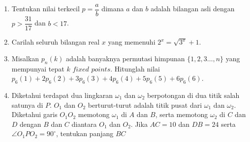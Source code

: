 \documentclass[12pt]{scrartcl}
\begin{document}
\begin{enumerate}[resume]
		\item Tentukan nilai terkecil $p = \dfrac{a}{b}$ dimana $a$ dan $b$ adalah bilangan asli dengan $p > \dfrac{31}{17}$ dan $b<17$.
	\item Carilah seluruh bilangan real $x$ yang memenuhi $2^x = \sqrt{3^x}+1$.
	
	\item Misalkan $p_n(k)$ adalah banyaknya permutasi himpunan $\{1,2,3\dots,n\}$ yang mempunyai tepat $k$ $\textit{fixed points}$. Hitunglah nilai $p_6(1)+2p_6(2)+3p_6(3)+4p_6(4)+5p_6(5)+6p_6(6)$.
	
	\item Diketahui terdapat dua lingkaran $\omega_1$ dan $\omega_2$ berpotongan di dua titik salah satunya di $P$. $O_1$ dan $O_2$ berturut-turut adalah titik pusat dari $\omega_1$ dan $\omega_2$. Diketahui garis $O_1O_2$ memotong $\omega_1$ di $A$ dan $B$, serta memotong $\omega_2$ di $C$ dan $D$ dengan $B$ dan $C$ diantara $O_1$ dan $O_2$. Jika $AC=10$ dan $DB=24$ serta $\angle O_1PO_2 = 90^\circ$, tentukan panjang $BC$
	
\end{enumerate}
\end{document}
